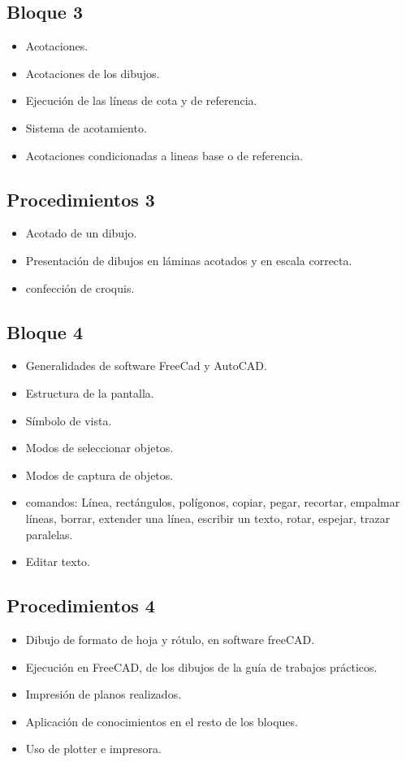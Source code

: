 \documentclass[../main]{subfiles}
\begin{document}
\subsection{ Bloque 3}
\begin{itemize}
    \item Acotaciones.
    \item Acotaciones de los dibujos.
    \item Ejecución de las líneas de cota y de referencia.
    \item Sistema de acotamiento.
    \item Acotaciones condicionadas a lineas base o de referencia.
\end{itemize}
\subsection{Procedimientos 3}
\begin{itemize}
    \item Acotado de un dibujo.
    \item Presentación de dibujos en láminas acotados y en escala correcta.
    \item confección de croquis.
\end{itemize}
\subsection{Bloque 4}
\begin{itemize}
    \item Generalidades de software FreeCad y AutoCAD.
    \item Estructura de la pantalla.
    \item Símbolo de vista.
    \item Modos de seleccionar objetos.
    \item Modos de captura de objetos.
    \item comandos: Línea, rectángulos, polígonos, copiar, pegar, recortar, empalmar líneas, borrar, extender una línea, escribir un texto, rotar, espejar, trazar paralelas.
    \item Editar texto.
\end{itemize}
\subsection{Procedimientos 4}
\begin{itemize}
                \item Dibujo de formato de hoja y rótulo, en software freeCAD.
                \item Ejecución en FreeCAD, de los dibujos de la guía de trabajos prácticos.
                \item Impresión de planos realizados.
                \item Aplicación de conocimientos en el resto de los bloques.
                \item Uso de plotter e impresora.
\end{itemize}
\end{document}
